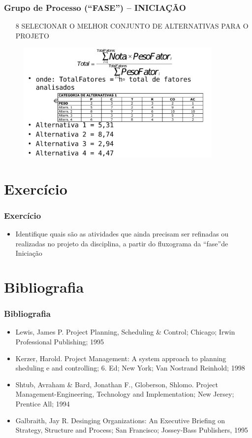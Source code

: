 \begin{frame}
 \frametitle{Grupo de Processo (“FASE”) – INICIAÇÃO}
 \begin{itemize}
  \item[8] SELECIONAR O MELHOR CONJUNTO DE ALTERNATIVAS PARA O PROJETO
 \end{itemize}

    \begin{figure}
    \centering
    \includegraphics[width = 0.9\textwidth]{figs/fig1_12.png}
   \end{figure}
\end{frame}

\section{Exercício}
\begin{frame}
 \frametitle{Exercício}
 \begin{itemize}
  \item Identifique quais são as atividades que ainda precisam ser refinadas ou realizadas no projeto da disciplina, a partir do fluxograma da “fase”de Iniciação
 \end{itemize}
\end{frame}

\section{Bibliografia}
\begin{frame}
 \frametitle{Bibliografia}
 \begin{itemize}
  \item Lewis, James P. Project Planning, Scheduling \& Control; Chicago; Irwin Professional Publishing; 1995
  \item Kerzer, Harold. Project Management: A system approach to planning sheduling e and controlling; 6. Ed; New York; Van Nostrand Reinhold; 1998
  \item Shtub, Avraham \& Bard, Jonathan F., Globerson, Shlomo. Project Management-Engineering, Technology and Implementation; New Jersey; Prentice All; 1994
  \item  Galbraith, Jay R. Desinging Organizations: An Executive Briefing on Strategy, Structure and Process; San Francisco; Jossey-Bass Publishers, 1995
 
  \end{itemize}
\end{frame}

